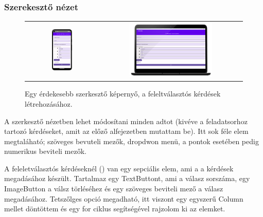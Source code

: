 \subsubsection{Szerekesztő nézet}

\begin{figure}[!ht]
    \centering
    \begin{tabular}{cc}
        \includegraphics[width=0.3\textwidth, keepaspectratio]{figures/Edit_Android.png} & 
        \includegraphics[width=0.6\textwidth, keepaspectratio]{figures/Edit_Desktop_framed.png}
    \end{tabular}
    \caption{Egy érdekesebb szerkesztő képernyő, a feleltválasztós kérdések létrehozásához.}
    \label{fig:EditScreen}
\end{figure}

A szerkesztő nézetben lehet módosítani minden adtot (kivéve a feladatsorhoz tartozó kérdéseket, amit az előző alfejezetben mutattam be).
Itt sok féle elem megtaláható; szöveges bevuteli mezők, dropdwon menü, a pontok esetében pedig numerikus beviteli mezők.

A feleletválasztós kérdéseknél () van egy sepciális elem, ami a a kérdések megadásához készült.
Tartalmaz egy TextButtont, ami a válasz sorszáma, egy ImageButton a válsz törléséhez és egy szöveges beviteli mező a válasz megadásához.
Tetszőlges opció megadható, itt viszont egy egyszerű Column mellet döntöttem és egy for ciklus segítségével rajzolom ki az elemket.



